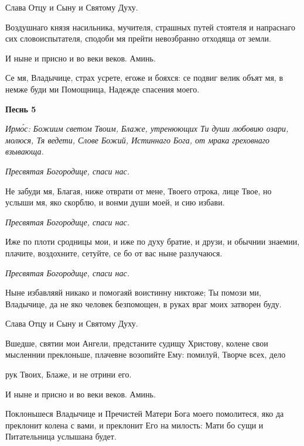    Слава Отцу и Сыну и Святому Духу.



   Воздушнаго князя насильника, мучителя, страшных путей стоятеля и
напраснаго сих словоиспытателя, сподоби мя прейти невозбранно отходяща
от земли.



   И ныне и присно и во веки веков. Аминь.



   Се мя, Владычице, страх усрете, егоже и бояхся: се подвиг велик объят
мя, в немже буди ми Помощница, Надежде спасения моего.



 

\bfseries Песнь 5\normalfont{}


 \itshape Ирмо́с:\normalfont{} Божиим светом Твоим, Блаже, утренюющих Ти души любовию озари,
молюся, Тя ведети, Слове Божий, Истиннаго Бога, от мрака греховнаго
взывающа.



 \itshape  Пресвятая Богородице, спаси нас.
\normalfont{}


   Не забуди мя, Благая, ниже отврати от мене, Твоего отрока, лице Твое,
но услыши мя, яко скорблю, и вонми души моей, и сию избави.



 \itshape  Пресвятая Богородице, спаси нас.
\normalfont{}


   Иже по плоти сродницы мои, и иже по духу братие, и друзи, и
обычнии знаемии, плачите, воздохните, сетуйте, се бо от вас ныне
разлучаюся.



 \itshape  Пресвятая Богородице, спаси нас.
\normalfont{}


   Ныне избавляяй никако и помогаяй воистинну никтоже; Ты помози ми,
Владычице, да не яко человек безпомощен, в руках враг моих затворен
буду.



   Слава Отцу и Сыну и Святому Духу.



   Вшедше, святии мои Ангели, предстаните судищу Христову, колене свои
мысленнии преклоньше, плачевне возопийте Ему: помилуй, Творче всех, дело

рук Твоих, Блаже, и не отрини его.



   И ныне и присно и во веки веков. Аминь.



   Поклоньшеся Владычице и Пречистей Матери Бога моего помолитеся,
яко да преклонит колена с вами, и преклонит Его на милость: Мати бо сущи
и Питательница услышана будет.




